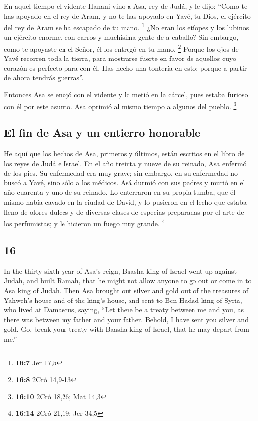 \begin{paracol}{2}
 En aquel tiempo el vidente Hanani vino a Asa, rey de
Judá, y le dijo: ``Como te has apoyado en el rey de Aram, y no te has
apoyado en Yavé, tu Dios, el ejército del rey de Aram se ha escapado de
tu mano. \footnote{\textbf{16:7} Jer 17,5}  ¿No eran los
etíopes y los lubinos un ejército enorme, con carros y muchísima gente
de a caballo? Sin embargo, como te apoyaste en el Señor, él los entregó
en tu mano. \footnote{\textbf{16:8} 2Cró 14,9-13}  Porque
los ojos de Yavé recorren toda la tierra, para mostrarse fuerte en favor
de aquellos cuyo corazón es perfecto para con él. Has hecho una tontería
en esto; porque a partir de ahora tendrás guerras''.

 Entonces Asa se enojó con el vidente y lo metió en la
cárcel, pues estaba furioso con él por este asunto. Asa oprimió al mismo
tiempo a algunos del pueblo. \footnote{\textbf{16:10} 2Cró 18,26; Mat
  14,3}

\hypertarget{el-fin-de-asa-y-un-entierro-honorable}{%
\subsection{El fin de Asa y un entierro
honorable}\label{el-fin-de-asa-y-un-entierro-honorable}}

 He aquí que los hechos de Asa, primeros y últimos, están
escritos en el libro de los reyes de Judá e Israel.  En
el año treinta y nueve de su reinado, Asa enfermó de los pies. Su
enfermedad era muy grave; sin embargo, en su enfermedad no buscó a Yavé,
sino sólo a los médicos.  Asá durmió con sus padres y
murió en el año cuarenta y uno de su reinado.  Lo
enterraron en su propia tumba, que él mismo había cavado en la ciudad de
David, y lo pusieron en el lecho que estaba lleno de olores dulces y de
diversas clases de especias preparadas por el arte de los perfumistas; y
le hicieron un fuego muy grande. \footnote{\textbf{16:14} 2Cró 21,19;
  Jer 34,5}

\switchcolumn
\begin{otherlanguage}{english}

\hypertarget{section-31}{%
\section{16}\label{section-31}}

 In the thirty-sixth year of Asa's reign, Baasha king of
Israel went up against Judah, and built Ramah, that he might not allow
anyone to go out or come in to Asa king of Judah.  Then
Asa brought out silver and gold out of the treasures of Yahweh's house
and of the king's house, and sent to Ben Hadad king of Syria, who lived
at Damascus, saying,  ``Let there be a treaty between me
and you, as there was between my father and your father. Behold, I have
sent you silver and gold. Go, break your treaty with Baasha king of
Israel, that he may depart from me.''


\end{otherlanguage}
\end{paracol}

